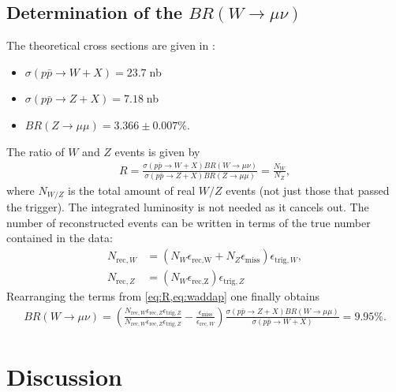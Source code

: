\documentclass[twoside,        %
               BCOR12mm,       %
               ngerman,english, %
               fleqn,headsepline=false,footsepline=false
              ]{Vorlage/MFPREPORT}
\begin{document}
\subsection{Determination of the $BR(W\rightarrow\mu\nu)$}
The theoretical cross sections are given in \cite{fprakt}:
\begin{itemize}
    \item $\sigma(p\bar p\rightarrow W+X)=23.7\;$nb
    \item $\sigma(p\bar p\rightarrow Z+X)=7.18\;$nb
    \item $BR(Z\rightarrow\mu\mu)=3.366\pm0.007\%$.
\end{itemize}
The ratio of $W$ and $Z$ events is given by \cite{fprakt}
\begin{align}
    \label{eq:R}
    R=\frac{\sigma(p\bar p \rightarrow W+X)BR(W\rightarrow\mu\nu)}{\sigma(p\bar
    p \rightarrow Z+X)BR(Z\rightarrow\mu\mu)}=\frac{N_W}{N_Z},
\end{align}
where $N_{W/Z}$ is the total amount of real $W/Z$ events (not just those that
passed the trigger). The integrated luminosity is not needed as it cancels out. The number of reconstructed events can be written in terms
of the true number contained in the data:
\begin{align}
    \label{eq:waddap}
    N_{\text{rec},W}&=(N_W \epsilon_\text{rec,W}+N_Z\epsilon_\text{miss})\epsilon_{\text{trig},W},\\
    N_{\text{rec},Z}&=(N_W \epsilon_\text{rec,Z})\epsilon_{\text{trig},Z}
\end{align}
Rearranging the terms from \cref{eq:R,eq:waddap} one finally obtains
\begin{align}
    \label{eq:BRRR}
    BR(W\rightarrow\mu\nu)=(\frac{N_{\text{rec},W}\epsilon_{\text{rec},Z}\epsilon_{\text{trig},Z}}{N_{\text{rec},W}\epsilon_{\text{rec},Z}\epsilon_{\text{trig},Z}}-\frac{\epsilon_{\text{miss}}}{\epsilon_{\text{rec},W}})\frac{\sigma(p\bar
    p\rightarrow Z+X)BR(W\rightarrow\mu\mu)}{\sigma(p\bar p\rightarrow
    W+X)}=9.95\%.
\end{align}


\label{ss:br}
\section{Discussion}
\label{sec:discussion}
\end{document}
